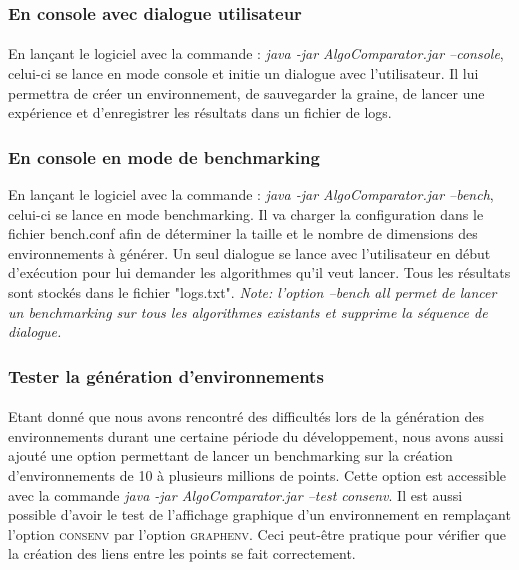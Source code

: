 \documentclass[pidr]{tnreport}
\begin{document}
			\subsubsection{En console avec dialogue utilisateur}

\paragraph{}
En lançant le logiciel avec la commande : \emph{java -jar AlgoComparator.jar --console}, celui-ci se lance en mode console et initie un dialogue avec l'utilisateur. Il lui permettra de créer un environnement, de sauvegarder la graine, de lancer une expérience et d'enregistrer les résultats dans un fichier de logs.

			\subsubsection{En console en mode de benchmarking}
			
En lançant le logiciel avec la commande : \emph{java -jar AlgoComparator.jar --bench}, celui-ci se lance en mode benchmarking. Il va charger la configuration dans le fichier bench.conf afin de déterminer la taille et le nombre de dimensions des environnements à générer. Un seul dialogue se lance avec l'utilisateur en début d'exécution pour lui demander les algorithmes qu'il veut lancer. Tous les résultats sont stockés dans le fichier "logs.txt". \newline
\emph{Note: l'option --bench all permet de lancer un benchmarking sur tous les algorithmes existants et supprime la séquence de dialogue.}
\cite{AIMA}
			
			\subsubsection{Tester la génération d'environnements}

\paragraph{}
Etant donné que nous avons rencontré des difficultés lors de la génération des environnements durant une certaine période du développement, nous avons aussi ajouté une option permettant de lancer un benchmarking sur la création d'environnements de 10 à plusieurs millions de points. Cette option est accessible avec la commande \emph{java -jar AlgoComparator.jar --test consenv}. \newline
Il est aussi possible d'avoir le test de l'affichage graphique d'un environnement en remplaçant l'option \textsc{consenv} par l'option \textsc{graphenv}. Ceci peut-être pratique pour vérifier que la création des liens entre les points se fait correctement.
\end{document}
